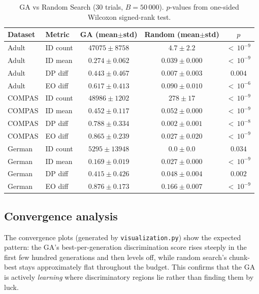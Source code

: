 \documentclass[10pt]{article}
\begin{document}
\begin{table}[h]
    \centering
    \caption{GA vs Random Search (30 trials, $B{=}50\,000$).  $p$-values from one-sided
    Wilcoxon signed-rank test.}
    \label{tab:main-results}
    \begin{tabular}{llccc}
        \toprule
        Dataset & Metric & GA (mean$\pm$std) & Random (mean$\pm$std) & $p$ \\
        \midrule
        Adult  & ID count & $47075 \pm 8758$  & $4.7 \pm 2.2$       & ${<}\,10^{-9}$ \\
        Adult  & ID mean  & $0.274 \pm 0.062$ & $0.039 \pm 0.000$   & ${<}\,10^{-9}$ \\
        Adult  & DP diff  & $0.443 \pm 0.467$ & $0.007 \pm 0.003$   & $0.004$ \\
        Adult  & EO diff  & $0.617 \pm 0.413$ & $0.090 \pm 0.010$   & ${<}\,10^{-6}$ \\
        \midrule
        COMPAS & ID count & $48986 \pm 1202$  & $278 \pm 17$        & ${<}\,10^{-9}$ \\
        COMPAS & ID mean  & $0.452 \pm 0.117$ & $0.052 \pm 0.000$   & ${<}\,10^{-9}$ \\
        COMPAS & DP diff  & $0.788 \pm 0.334$ & $0.002 \pm 0.001$   & ${<}\,10^{-8}$ \\
        COMPAS & EO diff  & $0.865 \pm 0.239$ & $0.027 \pm 0.020$   & ${<}\,10^{-9}$ \\
        \midrule
        German & ID count & $5295 \pm 13948$\footnotemark  & $0.0 \pm 0.0$       & $0.034$ \\
        German & ID mean  & $0.169 \pm 0.019$ & $0.027 \pm 0.000$   & ${<}\,10^{-9}$ \\
        German & DP diff  & $0.415 \pm 0.426$ & $0.048 \pm 0.004$   & $0.002$ \\
        German & EO diff  & $0.876 \pm 0.173$ & $0.166 \pm 0.007$   & ${<}\,10^{-9}$ \\
        \bottomrule
    \end{tabular}
\end{table}

\subsection{Convergence analysis}
The convergence plots (generated by \texttt{visualization.py}) show the expected
pattern: the GA's best-per-generation discrimination score rises steeply in the first
few hundred generations and then levels off, while random search's chunk-best stays
approximately flat throughout the budget.  This confirms that the GA is actively
\emph{learning} where discriminatory regions lie rather than finding them by luck.
\end{document}
